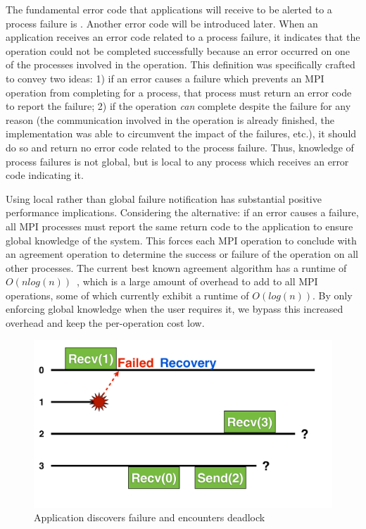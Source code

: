 The fundamental error code that applications will receive to be alerted to a
process failure is . Another error code will be
introduced later. When an application receives an error code related to a
process failure, it indicates that the operation could not be completed
successfully because an error occurred on one of the processes involved in the
operation. This definition was specifically crafted to convey two ideas: 1) if 
an error causes a failure which prevents an MPI operation from completing for a
process, that process must return an error code to report the failure; 2) if the
operation \textit{can} complete despite the failure for any reason (the communication involved in the operation is already finished, the implementation was able to circumvent the impact of the failures, etc.), it should do so and return
no error code related to the process failure. Thus, knowledge of process
failures is not global, but is local to any process which receives an error code
indicating it.

Using local rather than global failure notification has substantial positive 
performance implications. Considering the alternative: if an error causes a 
failure, all MPI processes
must report the same return code to the application to ensure global knowledge
of the system. This forces each MPI operation to conclude with an agreement
operation to determine the success or failure of the operation on all other
processes. The current best known agreement algorithm has a runtime of
$O(nlog(n))$~\cite{Hursey-log-agreement}, which is a large amount of overhead to
add to all MPI operations, some of which currently exhibit a runtime of
$O(log(n))$. By only enforcing global knowledge when the user requires it, we bypass this increased overhead and keep the per-operation cost low.

\begin{figure}[t]
    \centering
    \includegraphics[width=\linewidth]{figures/NoRevoke}
    \caption{Application discovers failure and encounters deadlock}
    \label{fig:ulfm:no-revoke}
\end{figure}

